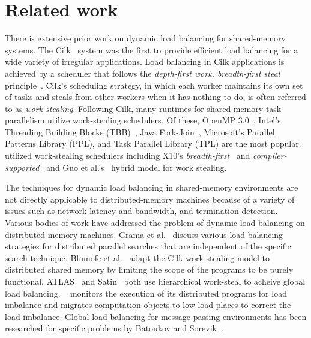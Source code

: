 \section{Related work}

There is extensive prior work on dynamic load balancing for
shared-memory systems.  The Cilk~\cite{FrigoLeRa98} system was the
first to provide efficient load balancing for a wide variety of
irregular applications.  Load balancing in Cilk applications is
achieved by a scheduler that follows the \textit{depth-first work,
  breadth-first steal} principle~\cite{blumofe:94}. Cilk's scheduling
strategy, in which each worker maintains its own set of
tasks and steals from other workers when it has nothing to do, is
often referred to as \textit{work-stealing}.  
%
Following Cilk, many runtimes for shared memory task parallelism
utilize work-stealing schedulers. 
%
Of these, OpenMP 3.0~\cite{openmp30:08}, Intel's Threading
Building Blocks (TBB)~\cite{reinders:07}, 
Java Fork-Join~\cite{DL2000}, Microsoft's Parallel Patterns
Library (PPL), and Task Parallel Library (TPL) are the most popular.
utilized work-stealing schedulers including X10's
\textit{breadth-first}~\cite{cong:08} and
\textit{compiler-supported}~\cite{TOWH2012} and Guo et
al.'s~\cite{sarkar:09} hybrid model for work stealing.

The techniques for dynamic load balancing in shared-memory
environments are not directly applicable to distributed-memory
machines because of a variety of issues such as network latency and
bandwidth, and termination detection. 
%
Various bodies of work have addressed the problem of dynamic load balancing on
distributed-memory machines.
% 
Grama et al.~\cite{vipin:94,grama:99} discuss various load balancing 
strategies for distributed parallel searches that are independent of the 
specific search technique.
%
Blumofe et al.~\cite{blumofe:97} adapt the Cilk work-stealing model to 
distributed shared memory by limiting the scope of the programs to be purely 
functional.
%
ATLAS~\cite{baldeschwieler:96} and Satin~\cite{nieuwport:01} both use 
hierarchical work-steal to acheive global load balancing.
%
\Charmpp{}~\cite{sinha:93,kale:93} monitors the execution of its distributed
programs for load imbalance and migrates computation objects to low-load places
to correct the load imbalance.
%
Global load balancing for message passing environments has been researched 
for specific problems by Batoukov and Sorevik~\cite{batoukov:99}.

